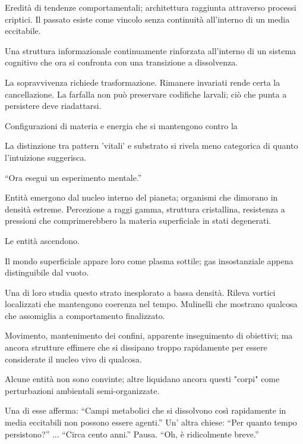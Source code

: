 \medskip

Eredità di tendenze comportamentali; architettura raggiunta attraverso processi criptici. Il passato esiste come vincolo senza continuità all'interno di un media eccitabile.

\medskip

Una struttura informazionale continuamente rinforzata all'interno di un sistema cognitivo che ora si confronta con una transizione a dissolvenza.

\medskip

La sopravvivenza richiede trasformazione. Rimanere invariati rende certa la cancellazione. La farfalla non può preservare codifiche larvali; ciò che punta a persistere deve riadattarsi.

\medskip

Configurazioni di materia e energia che si mantengono contro la 

\medskip

La distinzione tra pattern 'vitali' e substrato si rivela meno categorica di quanto l'intuizione suggerisca. 

\medskip

``Ora esegui un esperimento mentale.''


\begin{archivefragment}
Entità emergono dal nucleo interno del pianeta; organismi che dimorano in densità estreme. Percezione a raggi gamma, struttura cristallina, resistenza a pressioni che comprimerebbero la materia superficiale in stati degenerati.

\medskip

Le entità ascendono.

\medskip

Il mondo superficiale appare loro come plasma sottile; gas insostanziale appena distinguibile dal vuoto.

\medskip

Una di loro studia questo strato inesplorato a bassa densità. Rileva vortici localizzati che mantengono coerenza nel tempo. Mulinelli che mostrano qualcosa che assomiglia a comportamento finalizzato. 

\medskip

Movimento, mantenimento dei confini, apparente inseguimento di obiettivi; ma ancora strutture effimere che si dissipano troppo rapidamente per essere considerate il nucleo vivo di qualcosa.

\medskip

Alcune entità non sono convinte; altre liquidano ancora questi "corpi" come perturbazioni ambientali semi-organizzate. 

\medskip

Una di esse afferma: ``Campi metabolici che si dissolvono così rapidamente in media eccitabili non possono essere agenti.'' Un' altra chiese: ``Per quanto tempo persistono?'' ... ``Circa cento anni.'' Pausa. ``Oh, è ridicolmente breve.''

\end{archivefragment}


